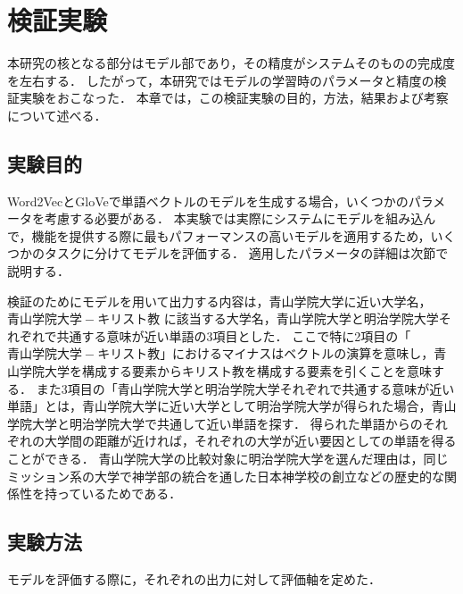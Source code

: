 \chapter{検証実験}
本研究の核となる部分はモデル部であり，その精度がシステムそのものの完成度を左右する．
したがって，本研究ではモデルの学習時のパラメータと精度の検証実験をおこなった．
本章では，この検証実験の目的，方法，結果および考察について述べる．

\section{実験目的}
Word2VecとGloVeで単語ベクトルのモデルを生成する場合，いくつかのパラメータを考慮する必要がある．
本実験では実際にシステムにモデルを組み込んで，機能を提供する際に最もパフォーマンスの高いモデルを適用するため，いくつかのタスクに分けてモデルを評価する．
適用したパラメータの詳細は次節で説明する．


検証のためにモデルを用いて出力する内容は，青山学院大学に近い大学名， $ 青山学院大学 - キリスト教 $ に該当する大学名，青山学院大学と明治学院大学それぞれで共通する意味が近い単語の3項目とした．
ここで特に2項目の「$ 青山学院大学 - キリスト教 $」におけるマイナスはベクトルの演算を意味し，青山学院大学を構成する要素からキリスト教を構成する要素を引くことを意味する．
また3項目の「青山学院大学と明治学院大学それぞれで共通する意味が近い単語」とは，青山学院大学に近い大学として明治学院大学が得られた場合，青山学院大学と明治学院大学で共通して近い単語を探す．
得られた単語からのそれぞれの大学間の距離が近ければ，それぞれの大学が近い要因としての単語を得ることができる．
青山学院大学の比較対象に明治学院大学を選んだ理由は，同じミッション系の大学で神学部の統合を通した日本神学校の創立などの歴史的な関係性を持っているためである．

\section{実験方法}
モデルを評価する際に，それぞれの出力に対して評価軸を定めた．


